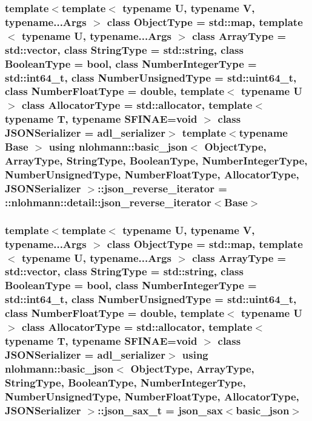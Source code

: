 \subsubsection[{\texorpdfstring{json\+\_\+reverse\+\_\+iterator}{json_reverse_iterator}}]{\setlength{\rightskip}{0pt plus 5cm}template$<$template$<$ typename U, typename V, typename...\+Args $>$ class Object\+Type = std\+::map, template$<$ typename U, typename...\+Args $>$ class Array\+Type = std\+::vector, class String\+Type  = std\+::string, class Boolean\+Type  = bool, class Number\+Integer\+Type  = std\+::int64\+\_\+t, class Number\+Unsigned\+Type  = std\+::uint64\+\_\+t, class Number\+Float\+Type  = double, template$<$ typename U $>$ class Allocator\+Type = std\+::allocator, template$<$ typename T, typename S\+F\+I\+N\+A\+E=void $>$ class J\+S\+O\+N\+Serializer = adl\+\_\+serializer$>$ template$<$typename Base $>$ using {\bf nlohmann\+::basic\+\_\+json}$<$ Object\+Type, Array\+Type, String\+Type, Boolean\+Type, Number\+Integer\+Type, Number\+Unsigned\+Type, Number\+Float\+Type, Allocator\+Type, J\+S\+O\+N\+Serializer $>$\+::{\bf json\+\_\+reverse\+\_\+iterator} =  \+::{\bf nlohmann\+::detail\+::json\+\_\+reverse\+\_\+iterator}$<$Base$>$\hspace{0.3cm}{\ttfamily [private]}}\hypertarget{classnlohmann_1_1basic__json_a8d18136ac63e52780e9d7441981a2db4}{}\label{classnlohmann_1_1basic__json_a8d18136ac63e52780e9d7441981a2db4}
\subsubsection[{\texorpdfstring{json\+\_\+sax\+\_\+t}{json_sax_t}}]{\setlength{\rightskip}{0pt plus 5cm}template$<$template$<$ typename U, typename V, typename...\+Args $>$ class Object\+Type = std\+::map, template$<$ typename U, typename...\+Args $>$ class Array\+Type = std\+::vector, class String\+Type  = std\+::string, class Boolean\+Type  = bool, class Number\+Integer\+Type  = std\+::int64\+\_\+t, class Number\+Unsigned\+Type  = std\+::uint64\+\_\+t, class Number\+Float\+Type  = double, template$<$ typename U $>$ class Allocator\+Type = std\+::allocator, template$<$ typename T, typename S\+F\+I\+N\+A\+E=void $>$ class J\+S\+O\+N\+Serializer = adl\+\_\+serializer$>$ using {\bf nlohmann\+::basic\+\_\+json}$<$ Object\+Type, Array\+Type, String\+Type, Boolean\+Type, Number\+Integer\+Type, Number\+Unsigned\+Type, Number\+Float\+Type, Allocator\+Type, J\+S\+O\+N\+Serializer $>$\+::{\bf json\+\_\+sax\+\_\+t} =  {\bf json\+\_\+sax}$<${\bf basic\+\_\+json}$>$}\hypertarget{classnlohmann_1_1basic__json_aa865c3eb68b6ebdd647173774d2b5cdb}{}\label{classnlohmann_1_1basic__json_aa865c3eb68b6ebdd647173774d2b5cdb}


